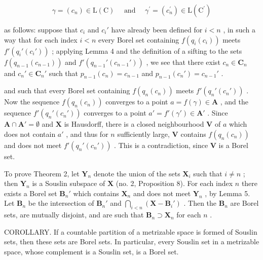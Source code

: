 \[
\gamma = (c _ {n}) \in \mathrm{L} (\mathrm{C}) \quad \text { and } \quad \gamma^ {\prime} = (c _ {n} ^ {\prime}) \in \mathrm{L} (\mathrm{C} ^ {\prime})
\]

as follows: suppose that \(c_i\) and \(c_i'\) have already been defined for \(i < n\) , in such a way that for each index \(i < n\) every Borel set containing \(f(q_i(c_i))\) meets \(f'(q_i'(c_i'))\) ; applying Lemma 4 and the definition of a sifting to the sets \(f(q_{n-1}(c_{n-1}))\) and \(f'(q_{n-1}'(c_{n-1}'))\) , we see that there exist \(c_n \in \mathbf{C}_n\) and \(c_n' \in \mathbf{C}_n'\) such that \(p_{n-1}(c_n) = c_{n-1}\) and \(p_{n-1}(c_n') = c_{n-1}'\) .

and such that every Borel set containing \(f(q_n(c_n))\) meets \(f'(q_n'(c_n'))\) . Now the sequence \(f(q_n(c_n))\) converges to a point \(a = f(\gamma) \in \mathbf{A}\) , and the sequence \(f'(q_n'(c_n'))\) converges to a point \(a' = f'(\gamma') \in \mathbf{A}'\) . Since \(\mathbf{A} \cap \mathbf{A}' = \emptyset\) and \(\mathbf{X}\) is Hausdorff, there is a closed neighbourhood \(\mathbf{V}\) of \(a\) which does not contain \(a'\) , and thus for \(n\) sufficiently large, \(\mathbf{V}\) contains \(f(q_n(c_n))\) and does not meet \(f'(q_n'(c_n'))\) . This is a contradiction, since \(\mathbf{V}\) is a Borel set.

To prove Theorem 2, let \(\mathbf{Y}_n\) denote the union of the sets \(\mathbf{X}_i\) such that \(i \neq n\) ; then \(\mathbf{Y}_n\) is a Souslin subspace of \(\mathbf{X}\) (no. 2, Proposition 8). For each index \(n\) there exists a Borel set \(\mathbf{B}_n'\) which contains \(\mathbf{X}_n\) and does not meet \(\mathbf{Y}_n\) , by Lemma 5. Let \(\mathbf{B}_n\) be the intersection of \(\mathbf{B}_n'\) and \(\bigcap_{i < n} (\mathbf{X} - \mathbf{B}_i')\) . Then the \(\mathbf{B}_n\) are Borel sets, are mutually disjoint, and are such that \(\mathbf{B}_n \supset \mathbf{X}_n\) for each \(n\) .

COROLLARY. If a countable partition of a metrizable space is formed of Souslin sets, then these sets are Borel sets. In particular, every Souslin set in a metrizable space, whose complement is a Souslin set, is a Borel set.

